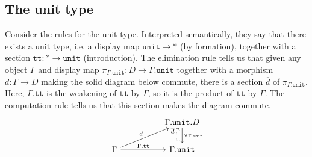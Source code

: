 \documentclass{article}
\theoremstyle{definition}
\newtheorem{theorem}[definition]{Theorem}
\newtheorem{exercise}[definition]{Exercise}
\newcommand{\T}{\mathbb T}
\newcommand{\C}{\mathcal C}
\newcommand{\syncat}[1]{\C [#1]}
\begin{document}


\subsection{The unit type}


Consider the rules for the unit type. Interpreted semantically, they say that there exists a unit type, i.e. a display map $\mathtt{unit} \to *$ (by formation), together with a section $\mathtt{tt} : * \to \mathtt{unit}$ (introduction). The elimination rule tells us that given any object $\Gamma$ and display map $\pi_{\Gamma.\mathtt{unit}}: D \to \Gamma.\mathtt{unit}$ together with a morphism $d : \Gamma \to D $ making the solid diagram below commute, there is a section $\overline d$ of $\pi_{\Gamma . \mathtt{unit}}$. Here, $\Gamma.\mathtt{tt}$ is the weakening of $\mathtt{tt}$ by $\Gamma$, so it is the product of $\mathtt{tt}$ by $\Gamma$.
The computation rule tells us that this section makes the diagram commute.
\[
     \begin{tikzcd}
         && \Gamma.\mathtt{unit}. D \ar[d,"\pi_{\Gamma.\mathtt{unit}}"] \\
         \Gamma \ar[rr,"\Gamma.\mathtt{tt}"] \ar[urr," d"] && \Gamma.\mathtt{unit} \ar[u,bend left,"\overline d",dotted]
     \end{tikzcd}
\]
\end{document}

